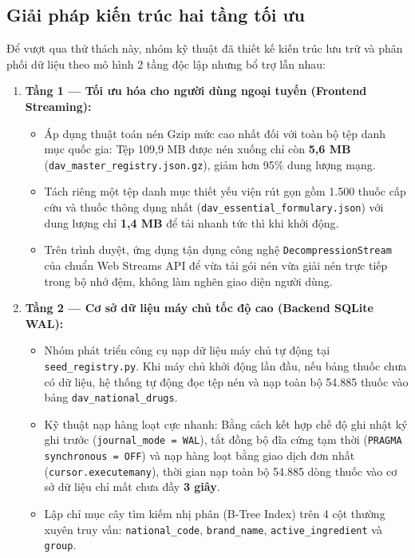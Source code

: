 \documentclass[12pt,a4paper]{article}
\begin{document}
\subsection{Giải pháp kiến trúc hai tầng tối ưu}
Để vượt qua thử thách này, nhóm kỹ thuật đã thiết kế kiến trúc lưu trữ và phân phối dữ liệu theo mô hình 2 tầng độc lập nhưng bổ trợ lẫn nhau:

\begin{enumerate}[leftmargin=1.5em]
    \item \textbf{Tầng 1 --- Tối ưu hóa cho người dùng ngoại tuyến (Frontend Streaming):}
    \begin{itemize}
        \item Áp dụng thuật toán nén Gzip mức cao nhất đối với toàn bộ tệp danh mục quốc gia: Tệp 109,9 MB được nén xuống chỉ còn \textbf{5,6 MB} (\texttt{dav\_master\_registry.json.gz}), giảm hơn 95\% dung lượng mạng.
        \item Tách riêng một tệp danh mục thiết yếu viện rút gọn gồm 1.500 thuốc cấp cứu và thuốc thông dụng nhất (\texttt{dav\_essential\_formulary.json}) với dung lượng chỉ \textbf{1,4 MB} để tải nhanh tức thì khi khởi động.
        \item Trên trình duyệt, ứng dụng tận dụng công nghệ \texttt{DecompressionStream} của chuẩn Web Streams API để vừa tải gói nén vừa giải nén trực tiếp trong bộ nhớ đệm, không làm nghẽn giao diện người dùng.
    \end{itemize}

    \item \textbf{Tầng 2 --- Cơ sở dữ liệu máy chủ tốc độ cao (Backend SQLite WAL):}
    \begin{itemize}
        \item Nhóm phát triển công cụ nạp dữ liệu máy chủ tự động tại \texttt{seed\_registry.py}. Khi máy chủ khởi động lần đầu, nếu bảng thuốc chưa có dữ liệu, hệ thống tự động đọc tệp nén và nạp toàn bộ 54.885 thuốc vào bảng \texttt{dav\_national\_drugs}.
        \item Kỹ thuật nạp hàng loạt cực nhanh: Bằng cách kết hợp chế độ ghi nhật ký ghi trước (\texttt{journal\_mode = WAL}), tắt đồng bộ đĩa cứng tạm thời (\texttt{PRAGMA synchronous = OFF}) và nạp hàng loạt bằng giao dịch đơn nhất (\texttt{cursor.executemany}), thời gian nạp toàn bộ 54.885 dòng thuốc vào cơ sở dữ liệu chỉ mất chưa đầy \textbf{3 giây}.
        \item Lập chỉ mục cây tìm kiếm nhị phân (B-Tree Index) trên 4 cột thường xuyên truy vấn: \texttt{national\_code}, \texttt{brand\_name}, \texttt{active\_ingredient} và \texttt{group}.
    \end{itemize}
\end{enumerate}
\end{document}
